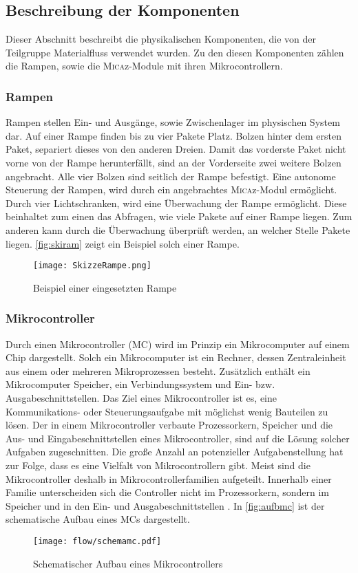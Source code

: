 \subsection{Beschreibung der Komponenten}
Dieser Abschnitt beschreibt die physikalischen Komponenten, die von der Teilgruppe Materialfluss verwendet wurden. Zu den diesen Komponenten zählen die Rampen, sowie die \textsc{Mica}z-Module mit ihren Mikrocontrollern. 
\subsubsection{Rampen}
Rampen stellen Ein- und Ausgänge, sowie Zwischenlager im physischen System dar. Auf einer Rampe finden bis zu vier Pakete Platz. Bolzen hinter dem ersten Paket, separiert dieses von den anderen Dreien. Damit das vorderste Paket nicht vorne von der Rampe herunterfällt, sind an der Vorderseite zwei weitere Bolzen angebracht. Alle vier Bolzen sind seitlich der Rampe befestigt. Eine autonome Steuerung der Rampen, wird durch ein angebrachtes \textsc{Mica}z-Modul ermöglicht. Durch vier Lichtschranken, wird eine Überwachung der Rampe ermöglicht. Diese beinhaltet zum einen das Abfragen, wie viele Pakete auf einer Rampe liegen. Zum anderen kann durch die Überwachung überprüft werden, an welcher Stelle Pakete liegen. \autoref{fig:skiram} zeigt ein Beispiel solch einer Rampe.

\begin{figure}[h!]
	\centering
		\texttt{[image: SkizzeRampe.png]}
	\caption{Beispiel einer eingesetzten Rampe}
	\label{fig:skiram}
\end{figure}

\subsubsection{Mikrocontroller}
Durch einen Mikrocontroller (MC) wird im Prinzip ein Mikrocomputer auf einem Chip dargestellt. Solch ein Mikrocomputer ist ein Rechner, dessen Zentraleinheit aus einem oder mehreren Mikroprozessen besteht. Zusätzlich enthält ein Mikrocomputer Speicher, ein Verbindungssystem und Ein- bzw. Ausgabeschnittstellen. Das Ziel eines Mikrocontroller ist es, eine Kommunikations- oder Steuerungsaufgabe mit möglichst wenig Bauteilen zu lösen. Der in einem Mikrocontroller verbaute Prozessorkern, Speicher und die Aus- und Eingabeschnittstellen eines Mikrocontroller, sind auf die Lösung solcher Aufgaben zugeschnitten. Die große Anzahl an potenzieller Aufgabenstellung hat zur Folge, dass es eine Vielfalt von Mikrocontrollern gibt. Meist sind die Mikrocontroller deshalb in Mikrocontrollerfamilien aufgeteilt. Innerhalb einer Familie unterscheiden sich die Controller nicht im Prozessorkern, sondern im Speicher und in den Ein- und Ausgabeschnittstellen \cite{ECHT2005}. In \autoref{fig:aufbmc} ist der schematische Aufbau eines MCs dargestellt.
\begin{figure}[th]
	\centering
		\texttt{[image: flow/schemamc.pdf]}
	\caption{Schematischer Aufbau eines Mikrocontrollers \cite[vgl.]{habil:Ostermeye:2014:Online}}
	\label{fig:aufbmc}
\end{figure}

